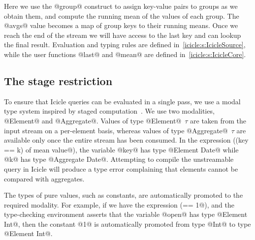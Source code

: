 Here we use the @group@ construct to assign key-value pairs to groups as we obtain them, and compute the running mean of the values of each group. The @avgs@ value becomes a map of group keys to their running means. Once we reach the end of the stream we will have access to the last key and can lookup the final result.
Evaluation and typing rules are defined in~\cref{icicle:s:IcicleSource}, while the user functions @last@ and @mean@ are defined in~\cref{icicle:s:IcicleCore}.


\subsection{The stage restriction}
To ensure that Icicle queries can be evaluated in a single pass, we use a modal type system inspired by staged computation~\cite{davies2001modal}.
We use two modalities, @Element@ and @Aggregate@.
Values of type @Element@~$\tau$ are taken from the input stream on a per-element basis, whereas values of type @Aggregate@~$\tau$ are available only once the entire stream has been consumed.
In the expression (\Ic@filter (key == k) of mean value@), the variable @key@ has type @Element Date@ while @k@ has type @Aggregate Date@.
Attempting to compile the unstreamable query in Icicle will produce a type error complaining that elements cannot be compared with aggregates.

The types of pure values, such as constants, are automatically promoted to the required modality.
For example, if we have the expression (\Ic@open == 1@), and the type-checking environment asserts that the variable @open@ has type @Element Int@, then the constant @1@ is automatically promoted from type @Int@ to type @Element Int@.



